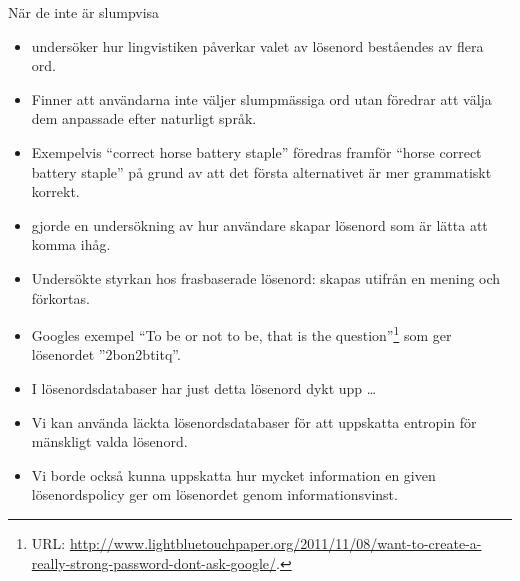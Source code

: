 \documentclass{beamer}
\theoremstyle{definition}
\begin{document}
\begin{frame}{\insertsubsectionhead}{När de inte är slumpvisa}
  \begin{itemize}
    \item \cite{Bonneau2012lpo} undersöker hur lingvistiken påverkar valet av 
      lösenord beståendes av flera ord.

    \item Finner att användarna inte väljer slumpmässiga ord utan föredrar att 
      välja dem anpassade efter naturligt språk.

    \item Exempelvis \enquote{correct horse battery staple} föredras framför 
      \enquote{horse correct battery staple} på grund av att det första 
      alternativet är mer grammatiskt korrekt.

  \end{itemize}
\end{frame}

\begin{frame}{\insertsubsectionhead}
  \begin{itemize}
    \item \cite{Kuo2006hso} gjorde en undersökning av hur användare skapar 
      lösenord som är lätta att komma ihåg.

    \item Undersökte styrkan hos frasbaserade lösenord:
      skapas utifrån en mening och förkortas.

    \item Googles exempel \enquote{To be or not to be, that is the 
        question}\footnote{%
        URL\@: 
        \protect\url{http://www.lightbluetouchpaper.org/2011/11/08/want-to-create-a-really-strong-password-dont-ask-google/}.
      } som ger lösenordet ''2bon2btitq''.

    \item I lösenordsdatabaser har just detta lösenord dykt upp \dots

  \end{itemize}
\end{frame}

\begin{frame}{\insertsubsectionhead}
  \begin{itemize}
    \item Vi kan använda läckta lösenordsdatabaser för att uppskatta entropin 
      för mänskligt valda lösenord.

    \item Vi borde också kunna uppskatta hur mycket information en given 
      lösenordspolicy ger om lösenordet genom informationsvinst.

  \end{itemize}
\end{frame}
\end{document}
